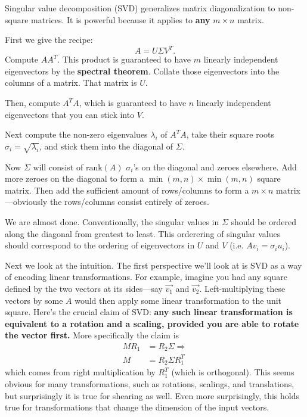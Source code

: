 \documentclass{article}
\begin{document}
Singular value decomposition (SVD) generalizes matrix diagonalization to non-square matrices. 
It is powerful because it applies to \textbf{any} $m \times n$ matrix.

First we give the recipe: 
\begin{equation} 
    A = U \Sigma V^T. \label{eq:SVD} \tag{SVD}
\end{equation}
Compute $AA^T$. This product is guaranteed to have $m$ linearly independent eigenvectors by the 
\textbf{spectral theorem}. Collate those eigenvectors into the columns of a matrix. That matrix is $U$. 

Then, compute $A^TA$, which is guaranteed to have $n$ linearly independent eigenvectors 
that you can stick into $V$.

Next compute the non-zero eigenvalues $\lambda_i$ of $A^TA$, take their square roots 
$\sigma_i = \sqrt{\lambda_i}$, and stick them into the diagonal of $\Sigma$. 

Now $\Sigma$ will consist of $\text{rank}(A)$ $\sigma_i$'s on the diagonal and zeroes elsewhere.
Add more zeroes on the diagonal to form a $\min(m, n) \times \min(m, n)$ square matrix. Then add the sufficient
amount of rows/columns to form a $m \times n$ matrix---obviously the rows/columns consist 
entirely of zeroes.

We are almost done. Conventionally, the singular values in $\Sigma$ should be ordered along the diagonal
from greatest to least. This orderering of singular values should correspond to the ordering of 
eigenvectors in $U$ and $V$ (i.e. $Av_i = \sigma_iu_i$).

Next we look at the intuition. The first perspective we'll look at is SVD as a way of encoding linear transformations.
For example, imagine you had any square defined by the two vectors at its sides---say $\vec{v_1}$
and $\vec{v_2}$. Left-multiplying these vectors by some $A$ would then apply some linear transformation
to the unit square. Here's the crucial claim of SVD: \textbf{any such linear transformation is equivalent
to a rotation and a scaling, provided you are able to rotate the vector first.} More specifically the 
claim is 
\begin{align}
MR_1 &= R_2\Sigma \Rightarrow \nonumber \\
M &= R_2 \Sigma R_1^T \nonumber
\end{align}
which comes from right multiplication by $R_1^T$ (which is orthogonal). This seems obvious for many
transformations, such as rotations, scalings, and translations, but surprisingly it
is true for shearing as well. Even more surprisingly, this holds true for transformations that change
the dimension of the input vectors.
\end{document}
